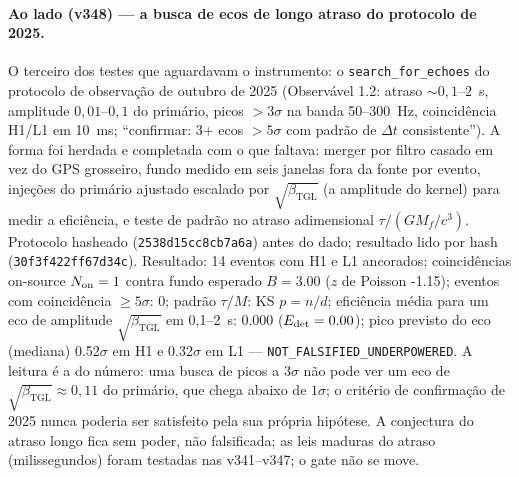 \documentclass[11pt]{article}
\newcommand{\bTGL}{\beta_{\mathrm{TGL}}}\newcommand{\Msun}{M_{\odot}}\newcommand{\TGL}{\mathrm{TGL}}
\theoremstyle{definition}\newtheorem{deriv}{Derivação}
\begin{document}
\paragraph*{Ao lado (v348) --- a busca de ecos de longo atraso do protocolo de 2025.} O terceiro dos testes que aguardavam o instrumento: o \texttt{search\_for\_echoes} do protocolo de observação de outubro de 2025 (Observável 1.2: atraso $\sim0{,}1$--$2$~s, amplitude $0{,}01$--$0{,}1$ do primário, picos $>3\sigma$ na banda 50--300~Hz, coincidência H1/L1 em 10~ms; ``confirmar: 3+ ecos $>5\sigma$ com padrão de $\Delta t$ consistente''). A forma foi herdada e completada com o que faltava: merger por filtro casado em vez do GPS grosseiro, fundo medido em seis janelas fora da fonte por evento, injeções do primário ajustado escalado por $\sqrt{\bTGL}$ (a amplitude do kernel) para medir a eficiência, e teste de padrão no atraso adimensional $\tau/(GM_f/c^3)$. Protocolo hasheado (\texttt{2538d15cc8cb7a6a}) antes do dado; resultado lido por hash (\texttt{30f3f422ff67d34c}). Resultado: 14 eventos com H1 e L1 ancorados; coincidências on-source $N_{\rm on}=1$ contra fundo esperado $B=3.00$ ($z$ de Poisson -1.15); eventos com coincidência $\ge5\sigma$: 0; padrão $\tau/M$: KS $p=n/d$; eficiência média para um eco de amplitude $\sqrt{\bTGL}$ em 0,1--2~s: 0.000 ($E_{\rm det}=0.00$); pico previsto do eco (mediana) 0.52$\sigma$ em H1 e 0.32$\sigma$ em L1 --- \texttt{NOT\_FALSIFIED\_UNDERPOWERED}. A leitura é a do número: uma busca de picos a $3\sigma$ não pode ver um eco de $\sqrt{\bTGL}\approx0{,}11$ do primário, que chega abaixo de $1\sigma$; o critério de confirmação de 2025 nunca poderia ser satisfeito pela sua própria hipótese. A conjectura do atraso longo fica sem poder, não falsificada; as leis maduras do atraso (milissegundos) foram testadas nas v341--v347; o gate não se move.
\end{document}

